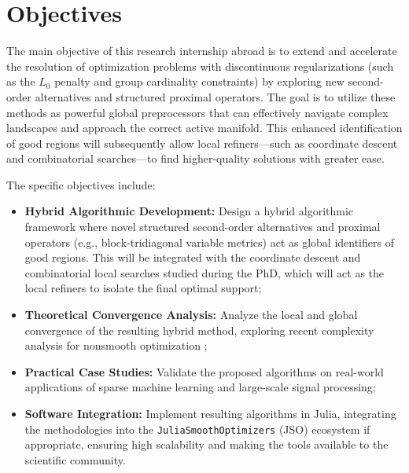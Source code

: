 \section{Objectives}

The main objective of this research internship abroad is to extend and accelerate the resolution of optimization problems with discontinuous regularizations (such as the $L_0$ penalty and group cardinality constraints) by exploring new second-order alternatives and structured proximal operators. The goal is to utilize these methods as powerful global preprocessors that can effectively navigate complex landscapes and approach the correct active manifold. This enhanced identification of good regions will subsequently allow local refiners---such as coordinate descent and combinatorial searches---to find higher-quality solutions with greater ease.

The specific objectives include:
\begin{itemize}
    \item \textbf{Hybrid Algorithmic Development:} Design a hybrid algorithmic framework where novel structured second-order alternatives and proximal operators (e.g., block-tridiagonal variable metrics) act as global identifiers of good regions. This will be integrated with the coordinate descent and combinatorial local searches studied during the PhD, which will act as the local refiners to isolate the final optimal support;
    \item \textbf{Theoretical Convergence Analysis:} Analyze the local and global convergence of the resulting hybrid method, exploring recent complexity analysis for nonsmooth optimization \cite{leconte2023complexity};
    \item \textbf{Practical Case Studies:} Validate the proposed algorithms on real-world applications of sparse machine learning and large-scale signal processing;
    \item \textbf{Software Integration:} Implement resulting algorithms in Julia, integrating the methodologies into the \texttt{JuliaSmoothOptimizers} (JSO) ecosystem if appropriate, ensuring high scalability and making the tools available to the scientific community.
\end{itemize}


